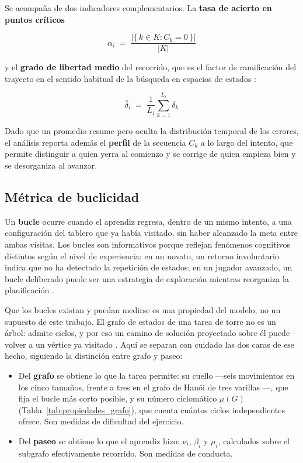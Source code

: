 \documentclass{book}
\begin{document}
Se acompaña de dos indicadores complementarios. La
\textbf{tasa de acierto en puntos críticos}

\begin{equation}
    \alpha_i \;=\; \frac{|\{\,k \in K : C_k = 0\,\}|}{|K|}
    \label{eq:tasa_acierto}
\end{equation}

y el \textbf{grado de libertad medio} del recorrido, que es el
factor de ramificación del trayecto en el sentido habitual de la
búsqueda en espacios de estados \cite{RussellNorvig2021}:

\begin{equation}
    \bar{\delta}_i \;=\; \frac{1}{L_i}\sum_{k=1}^{L_i} \delta_k
    \label{eq:grado_medio}
\end{equation}

Dado que un promedio resume pero oculta la distribución temporal de
los errores, el análisis reporta además el \textbf{perfil} de la
secuencia $C_k$ a lo largo del intento, que permite distinguir a
quien yerra al comienzo y se corrige de quien empieza bien y se
desorganiza al avanzar.

\subsection*{Métrica de buclicidad}

Un \textbf{bucle} ocurre cuando el aprendiz regresa, dentro de un
mismo intento, a una configuración del tablero que ya había
visitado, sin haber alcanzado la meta entre ambas visitas. Los
bucles son informativos porque reflejan fenómenos cognitivos
distintos según el nivel de experiencia: en un novato, un retorno
involuntario indica que no ha detectado la repetición de estados;
en un jugador avanzado, un bucle deliberado puede ser una estrategia
de exploración mientras reorganiza la planificación
\cite{LievanoMolina2022}.


Que los bucles existan y puedan medirse es una propiedad del modelo,
no un supuesto de este trabajo. El grafo de estados de una tarea de
torre no es un árbol: admite ciclos, y por eso un camino de solución
proyectado sobre él puede volver a un vértice ya visitado
\cite{Hinz2012, Hinz2018}. Aquí se separan con cuidado las dos caras
de ese hecho, siguiendo la distinción entre grafo y paseo:

\begin{itemize}
    \item Del \textbf{grafo} se obtiene lo que la tarea permite: su
    cuello —seis movimientos en los cinco tamaños, frente a tres en
    el grafo de Hanói de tres varillas \cite{Hinz2018}—, que fija el
    bucle más corto posible, y su número ciclomático $\mu(G)$
    (Tabla~\ref{tab:propiedades_grafo}), que cuenta cuántos ciclos
    independientes ofrece. Son medidas de dificultad del ejercicio.
    \item Del \textbf{paseo} se obtiene lo que el aprendiz hizo:
    $\nu_i$, $\beta_i$ y $\mu_i$, calculados sobre el subgrafo
    efectivamente recorrido. Son medidas de conducta.
\end{itemize}
\end{document}

